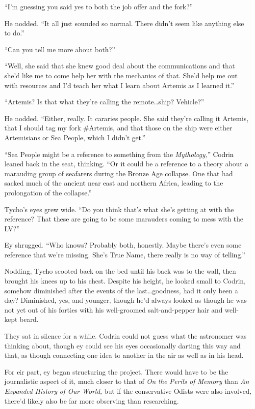 ``I'm guessing you said yes to both the job offer and the fork?''

He nodded. ``It all just sounded so normal. There didn't seem like anything else to do.''

``Can you tell me more about both?''

``Well, she said that she knew good deal about the communications and that she'd like me to come help her with the mechanics of that. She'd help me out with resources and I'd teach her what I learn about Artemis as I learned it.''

``Artemis? Is that what they're calling the remote\ldots ship? Vehicle?''

He nodded. ``Either, really. It cararies people. She said they're calling it Artemis, that I should tag my fork \#Artemis, and that those on the ship were either Artemisians or Sea People, which I didn't get.''

``Sea People might be a reference to something from the \emph{Mythology,}'' Codrin leaned back in the seat, thinking. ``Or it could be a reference to a theory about a marauding group of seafarers during the Bronze Age collapse. One that had sacked much of the ancient near east and northern Africa, leading to the prolongation of the collapse.''

Tycho's eyes grew wide. ``Do you think that's what she's getting at with the reference? That these are going to be some marauders coming to mess with the LV?''

Ey shrugged. ``Who knows? Probably both, honestly. Maybe there's even some reference that we're missing. She's True Name, there really is no way of telling.''

Nodding, Tycho scooted back on the bed until his back was to the wall, then brought his knees up to his chest. Despite his height, he looked small to Codrin, somehow diminished after the events of the last\ldots goodness, had it only been a day? Diminished, yes, and younger, though he'd always looked as though he was not yet out of his forties with his well-groomed salt-and-pepper hair and well-kept beard.

They sat in silence for a while. Codrin could not guess what the astronomer was thinking about, though ey could see his eyes occasionally darting this way and that, as though connecting one idea to another in the air as well as in his head.

For eir part, ey began structuring the project. There would have to be the journalistic aspect of it, much closer to that of \emph{On the Perils of Memory} than \emph{An Expanded History of Our World,} but if the conservative Odists were also involved, there'd likely also be far more observing than researching.

